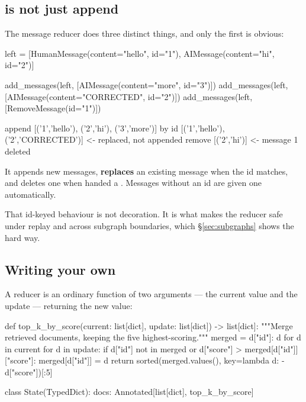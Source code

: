 \subsection{\texorpdfstring{}{add-messages} is not just append}
\label{sec:add-messages}

The message reducer does three distinct things, and only the first is obvious:

\begin{python}[caption={Three behaviours of one reducer}, label={lst:add-messages}]
left = [HumanMessage(content="hello", id="1"), AIMessage(content="hi", id="2")]

add_messages(left, [AIMessage(content="more", id="3")])
add_messages(left, [AIMessage(content="CORRECTED", id="2")])
add_messages(left, [RemoveMessage(id="1")])
\end{python}

\begin{console}
append    [('1','hello'), ('2','hi'), ('3','more')]
by id     [('1','hello'), ('2','CORRECTED')]      <- replaced, not appended
remove    [('2','hi')]                            <- message 1 deleted
\end{console}

It appends new messages, \textbf{replaces} an existing message when the id
matches, and deletes one when handed a . Messages without an
id are given one automatically.

That id-keyed behaviour is not decoration. It is what makes the reducer safe
under replay and across subgraph boundaries, which \S\ref{sec:subgraphs} shows
the hard way.

\subsection{Writing your own}
\label{sec:custom-reducer}

A reducer is an ordinary function of two arguments --- the current value and the
update --- returning the new value:

\begin{python}[caption={A reducer that keeps the best few by score}, label={lst:custom-reducer}]
def top_k_by_score(current: list[dict], update: list[dict]) -> list[dict]:
    """Merge retrieved documents, keeping the five highest-scoring."""
    merged = {d["id"]: d for d in current}
    for d in update:
        if d["id"] not in merged or d["score"] > merged[d["id"]]["score"]:
            merged[d["id"]] = d
    return sorted(merged.values(), key=lambda d: -d["score"])[:5]


class State(TypedDict):
    docs: Annotated[list[dict], top_k_by_score]
\end{python}

